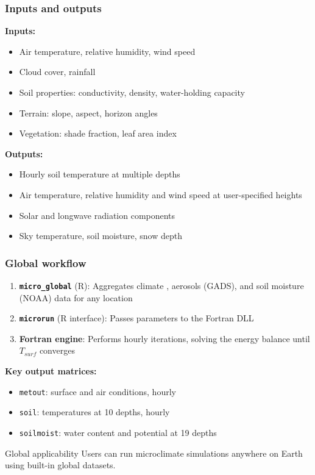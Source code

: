 \documentclass{beamer}
\begin{document}
\begin{frame}
  \frametitle{Inputs and outputs}

  \textbf{Inputs:}
  \begin{itemize}
    \item Air temperature, relative humidity, wind speed
    \item Cloud cover, rainfall
    \item Soil properties: conductivity, density, water-holding capacity
    \item Terrain: slope, aspect, horizon angles
    \item Vegetation: shade fraction, leaf area index
  \end{itemize}

  \vspace{0.2cm}

  \textbf{Outputs:}
  \begin{itemize}
    \item Hourly soil temperature at multiple depths
    \item Air temperature, relative humidity and wind speed at user-specified heights
    \item Solar and longwave radiation components
    \item Sky temperature, soil moisture, snow depth
  \end{itemize}
\end{frame}

\begin{frame}
  \frametitle{Global workflow}

  \begin{enumerate}
    \item \textbf{\texttt{micro\_global}} (R): Aggregates climate \parencite{new2002}, aerosols (GADS), and soil moisture (NOAA) data for any location
    \item \textbf{\texttt{microrun}} (R interface): Passes parameters to the Fortran DLL
    \item \textbf{Fortran engine}: Performs hourly iterations, solving the energy balance until $T_{surf}$ converges
  \end{enumerate}

  \vspace{0.3cm}

  \textbf{Key output matrices:}
  \begin{itemize}
    \item \texttt{metout}: surface and air conditions, hourly
    \item \texttt{soil}: temperatures at 10 depths, hourly
    \item \texttt{soilmoist}: water content and potential at 19 depths
  \end{itemize}

  \vspace{0.2cm}

  \begin{block}{Global applicability}
    Users can run microclimate simulations anywhere on Earth using built-in global datasets.
  \end{block}
\end{frame}
\end{document}
